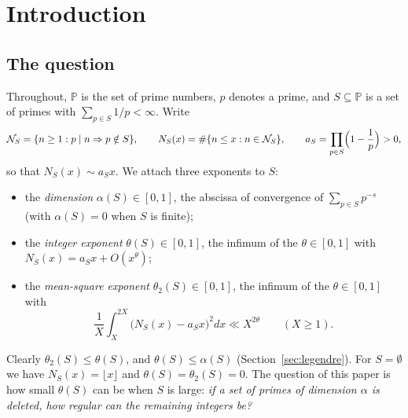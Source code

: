 \documentclass[11pt]{amsart}
\theoremstyle{remark}
\numberwithin{equation}{section}
\newcommand{\PP}{\mathbb{P}}
\newcommand{\cN}{\mathcal{N}}
\begin{document}
\section{Introduction}

\subsection{The question}
Throughout, $\PP$ is the set of prime numbers, $p$ denotes a prime, and $S\subseteq\PP$ is a set of primes with $\sum_{p\in S}1/p<\infty$. Write
\[
\cN_S=\{n\ge 1 : p\mid n\Rightarrow p\notin S\},\qquad N_S(x)=\#\{n\le x: n\in\cN_S\},\qquad a_S=\prod_{p\in S}\Bigl(1-\frac1p\Bigr)>0,
\]
so that $N_S(x)\sim a_Sx$. We attach three exponents to $S$:
\begin{itemize}
\item the \emph{dimension} $\alpha(S)\in[0,1]$, the abscissa of convergence of $\sum_{p\in S}p^{-s}$ (with $\alpha(S)=0$ when $S$ is finite);
\item the \emph{integer exponent} $\theta(S)\in[0,1]$, the infimum of the $\theta\in[0,1]$ with $N_S(x)=a_Sx+O(x^{\theta})$;
\item the \emph{mean-square exponent} $\theta_2(S)\in[0,1]$, the infimum of the $\theta\in[0,1]$ with
\[
\frac1X\int_X^{2X}\bigl(N_S(x)-a_Sx\bigr)^2dx\ll X^{2\theta}\qquad(X\ge1).
\]
\end{itemize}
Clearly $\theta_2(S)\le\theta(S)$, and $\theta(S)\le\alpha(S)$ (Section~\ref{sec:legendre}). For $S=\emptyset$ we have $N_S(x)=\lfloor x\rfloor$ and $\theta(S)=\theta_2(S)=0$. The question of this paper is how small $\theta(S)$ can be when $S$ is large: \emph{if a set of primes of dimension $\alpha$ is deleted, how regular can the remaining integers be?}
\end{document}
